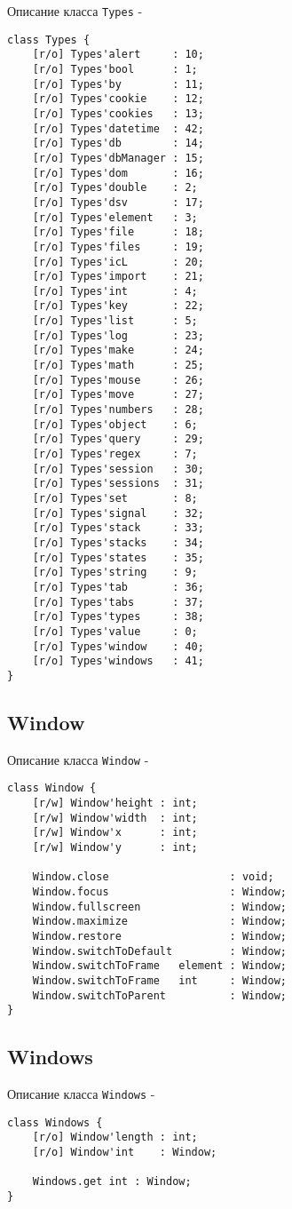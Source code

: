 \noindent Описание класса \texttt{Types} -
\begin{verbatim}
class Types {
    [r/o] Types'alert     : 10;
	[r/o] Types'bool      : 1;
	[r/o] Types'by        : 11;
	[r/o] Types'cookie    : 12;
	[r/o] Types'cookies   : 13;
	[r/o] Types'datetime  : 42;
	[r/o] Types'db        : 14;
	[r/o] Types'dbManager : 15;
	[r/o] Types'dom       : 16;
	[r/o] Types'double    : 2;
	[r/o] Types'dsv       : 17;
	[r/o] Types'element   : 3;
	[r/o] Types'file      : 18;
	[r/o] Types'files     : 19;
	[r/o] Types'icL       : 20;
	[r/o] Types'import    : 21;
	[r/o] Types'int       : 4;
	[r/o] Types'key       : 22;
	[r/o] Types'list      : 5;
	[r/o] Types'log       : 23;
	[r/o] Types'make      : 24;
	[r/o] Types'math      : 25;
	[r/o] Types'mouse     : 26;
	[r/o] Types'move      : 27;
	[r/o] Types'numbers   : 28;
	[r/o] Types'object    : 6;
	[r/o] Types'query     : 29;
	[r/o] Types'regex     : 7;
	[r/o] Types'session   : 30;
	[r/o] Types'sessions  : 31;
	[r/o] Types'set       : 8;
	[r/o] Types'signal    : 32;
	[r/o] Types'stack     : 33;
	[r/o] Types'stacks    : 34;
	[r/o] Types'states    : 35;
	[r/o] Types'string    : 9;
	[r/o] Types'tab       : 36;
	[r/o] Types'tabs      : 37;
	[r/o] Types'types     : 38;
	[r/o] Types'value     : 0;
	[r/o] Types'window    : 40;
	[r/o] Types'windows   : 41;
}
\end{verbatim}

\subsection{{\color{orange} Window}}

\noindent Описание класса \texttt{Window} -
\begin{verbatim}
class Window {
    [r/w] Window'height : int;
	[r/w] Window'width  : int;
	[r/w] Window'x      : int;
	[r/w] Window'y      : int;
	
    Window.close                   : void;
	Window.focus                   : Window;
	Window.fullscreen              : Window;
	Window.maximize                : Window;
	Window.restore                 : Window;
	Window.switchToDefault         : Window;
	Window.switchToFrame   element : Window;
	Window.switchToFrame   int     : Window;
	Window.switchToParent          : Window;
}
\end{verbatim}

\subsection{{\color{orange} Windows}}

\noindent Описание класса \texttt{Windows} -
\begin{verbatim}
class Windows {
    [r/o] Window'length : int;
	[r/o] Window'int    : Window;
	
    Windows.get int : Window;
}
\end{verbatim}


